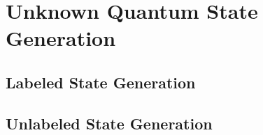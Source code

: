 \chapter{Unknown Quantum State Generation}\label{chapter:my_contribution}
\section{Labeled State Generation}
\section{Unlabeled State Generation}
